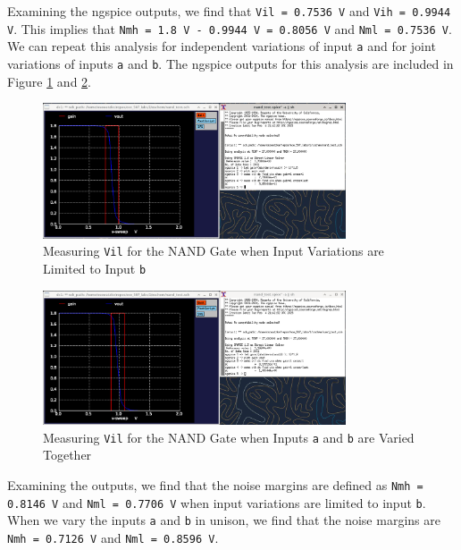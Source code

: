 \documentclass[fleqn]{article}
\begin{document}
	Examining the ngspice outputs, we find that \texttt{Vil = 0.7536 V} and \texttt{Vih = 0.9944 V}. This implies that \texttt{Nmh = 1.8 V - 0.9944 V = 0.8056 V} and \texttt{Nml = 0.7536 V}. We can repeat this analysis for independent variations of input \texttt{a} and for joint variations of inputs \texttt{a} and \texttt{b}. The ngspice outputs for this analysis are included in Figure \ref{fig::nand_noise_analysis_sweep_vb} and \ref{fig::nand_noise_analysis_sweep_va_vb}.
	
	\begin{figure}[H]
		\centerline{\includegraphics[width=0.8\textwidth]{nand_noise_analysis_sweep_vb.png}}
		\caption{Measuring \texttt{Vil} for the NAND Gate when Input Variations are Limited to Input \texttt{b}}
		\label{fig::nand_noise_analysis_sweep_vb}
	\end{figure}
	
	\begin{figure}[H]
		\centerline{\includegraphics[width=0.8\textwidth]{nand_noise_analysis_sweep_va_vb.png}}
		\caption{Measuring \texttt{Vil} for the NAND Gate when Inputs \texttt{a} and \texttt{b} are Varied Together}
		\label{fig::nand_noise_analysis_sweep_va_vb}
	\end{figure}
	
	Examining the outputs, we find that the noise margins are defined as \texttt{Nmh = 0.8146 V} and \texttt{Nml = 0.7706 V} when input variations are limited to input \texttt{b}. When we vary the inputs \texttt{a} and \texttt{b} in unison, we find that the noise margins are \texttt{Nmh = 0.7126 V} and \texttt{Nml = 0.8596 V}.
	
\end{document}
